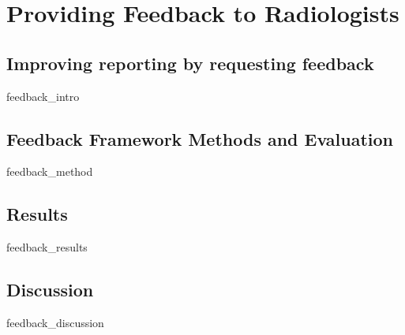 \chapter{Providing Feedback to Radiologists}

\section{Improving reporting by requesting feedback}
{feedback_intro}
\clearpage

\section{Feedback Framework Methods and Evaluation}
{feedback_method}
\clearpage

\section{Results}
{feedback_results}
\clearpage

\section{Discussion}
{feedback_discussion}